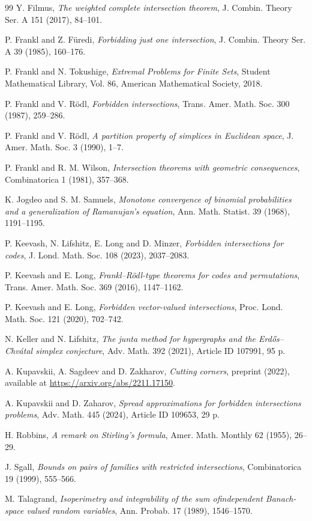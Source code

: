 \begin{thebibliography}{99}
 Y. Filmus,
\textit{The weighted complete intersection theorem},
J. Combin. Theory Ser. A 151 (2017), 84--101.

 P. Frankl and Z. F\"{u}redi,
\emph{Forbidding just one intersection}, J. Combin. Theory Ser. A 39 (1985), 160--176.

 P. Frankl and N. Tokushige,
\emph{Extremal Problems for Finite Sets},
Student Mathematical Library, Vol. 86, American Mathematical Society, 2018.

 P. Frankl and V. R\"{o}dl,
\emph{Forbidden intersections}, Trans. Amer. Math. Soc. 300 (1987), 259--286.

 P. Frankl and V. R\"{o}dl,
\emph{A partition property of simplices in Euclidean space},
J. Amer. Math. Soc. 3 (1990), 1--7.

 P. Frankl and R. M. Wilson,
\emph{Intersection theorems with geometric consequences},
Combinatorica 1 (1981), 357--368.

 K. Jogdeo and S. M. Samuels,
\emph{Monotone convergence of binomial probabilities and a generalization of Ramanujan's equation},
Ann. Math. Statist. 39 (1968), 1191--1195.

 P. Keevash, N. Lifshitz, E. Long and D. Minzer,
\emph{Forbidden intersections for codes},
J. Lond. Math. Soc. 108 (2023), 2037--2083.

 P. Keevash and E. Long,
\emph{Frankl--R\"{o}dl-type theorems for codes and permutations},
Trans. Amer. Math. Soc. 369 (2016), 1147--1162.

 P. Keevash and E. Long,
\emph{Forbidden vector-valued intersections},
Proc. Lond. Math. Soc. 121 (2020), 702--742.

 N. Keller and N. Lifshitz,
\emph{The junta method for hypergraphs and the Erd\H{o}s--Chv\'{a}tal simplex conjecture},
Adv. Math. 392 (2021), Article ID 107991, 95 p.

 A. Kupavskii, A. Sagdeev and D. Zakharov,
\emph{Cutting corners}, preprint (2022), available at \url{https://arxiv.org/abs/2211.17150}.

 A. Kupavskii and D. Zaharov,
\emph{Spread approximations for forbidden intersections problems},
Adv. Math. 445 (2024), Article ID 109653, 29 p.

 H. Robbins,
\textit{A remark on Stirling's formula},
Amer. Math. Monthly 62 (1955), 26--29.

 J. Sgall,
\emph{Bounds on pairs of families with restricted intersections},
Combinatorica 19 (1999), 555--566.

 M. Talagrand,
\emph{Isoperimetry and integrability of the sum ofindependent Banach-space valued random variables},
Ann. Probab. 17 (1989), 1546--1570.

\end{thebibliography}
